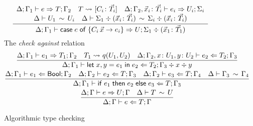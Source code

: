 \begin{figure}[h!]
\begin{gather*}
{    }
  \\
  \frac{
    \begin{array}{c}
    \algtypeout[\kindEnv;\varEnv_1]{e}{T}{\varEnv_2}
    \quad
    T \Extract{}[C_i\colon\vec T_i]
    \quad
    \algtypeout[\kindEnv;\varEnv_2, \vec x_i\colon\vec T_i]{e_i}{U_i}{\Sigma_i}
    \\
    \typeequiv{U_1}{U_i}    
    \quad
    \ctxequiv{\Sigma_1 \div (\vec x_i\colon\vec T_i)}{\Sigma_i \div (\vec x_i\colon\vec T_i)} 
    \end{array}
  }{
    \algtypeout[\kindEnv;\varEnv_1]{\casee{e}{\{C_i\,\vec x\rightarrow e_i\}}}{U}{\Sigma_1 \div (\vec x_1\colon\vec T_1)}
  }
  \end{gather*}
  The \emph{check against} relation\hfill{}
  \begin{gather*}
    \frac{
      \algtypeout[\kindEnv ; \varEnv_1]{e_1}{T_1}{\varEnv_2}
      \quad
      T_1 \Extract{} q(U_1, U_2)
      \quad
      \algtypein[\kindEnv; \varEnv_2, x\colon U_1, y\colon U_2]{e_2}{T_2}{\varEnv_3}
    }{
      \algtypein[\kindEnv;
      \varEnv_1]{\binlete{x}{y}{e_1}{e_2}}{T_2}{\varEnv_3} \div x \div y
    }
    \\
    \frac{
      \algtypein[\kindEnv;\varEnv_1]{e_1}{\boole}{\varEnv_2}
      \quad
      \algtypein[\kindEnv;\varEnv_2]{e_2}{T}{\varEnv_3}
      \quad
      \algtypein[\kindEnv;\varEnv_2]{e_3}{T}{\varEnv_4}
      \quad
      \ctxequiv{\varEnv_3}{\varEnv_4}
    }{
      \algtypein[\kindEnv;\varEnv_1]{\conditionale{e_1}{e_2}{e_3}}{T}{\varEnv_3}
    }
    \\
        \frac{
      \algtypeout e U \varEnv
      \quad
      \typeequiv T U
    }{
      \algtypein e T \varEnv
    }
  \end{gather*}
  \caption{Algorithmic type checking}
  \label{fig:alg-typing}
\end{figure}

